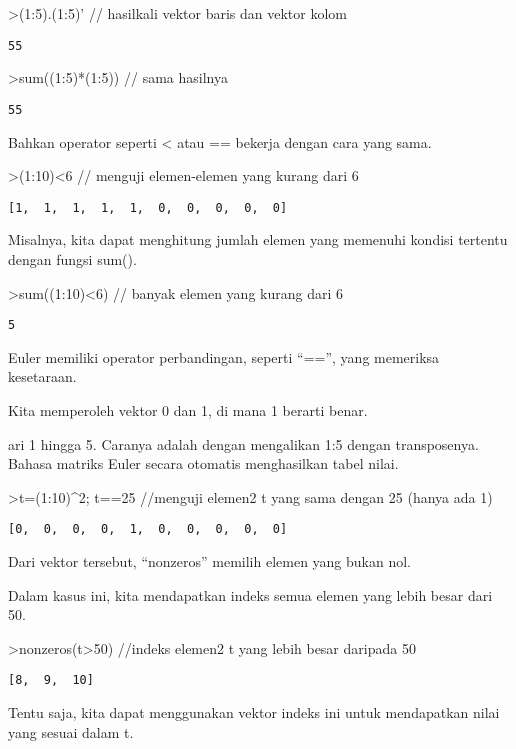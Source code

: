 \documentclass[
]{book}
\begin{document}
\textgreater(1:5).(1:5)' // hasilkali vektor baris dan vektor kolom

\begin{verbatim}
55
\end{verbatim}

\textgreater sum((1:5)*(1:5)) // sama hasilnya

\begin{verbatim}
55
\end{verbatim}

Bahkan operator seperti \textless{} atau == bekerja dengan cara yang sama.

\textgreater(1:10)\textless6 // menguji elemen-elemen yang kurang dari 6

\begin{verbatim}
[1,  1,  1,  1,  1,  0,  0,  0,  0,  0]
\end{verbatim}

Misalnya, kita dapat menghitung jumlah elemen yang memenuhi kondisi tertentu dengan fungsi sum().

\textgreater sum((1:10)\textless6) // banyak elemen yang kurang dari 6

\begin{verbatim}
5
\end{verbatim}

Euler memiliki operator perbandingan, seperti ``=='', yang memeriksa kesetaraan.

Kita memperoleh vektor 0 dan 1, di mana 1 berarti benar.

ari 1 hingga 5. Caranya adalah dengan mengalikan 1:5 dengan transposenya. Bahasa matriks Euler secara otomatis menghasilkan tabel nilai.

\textgreater t=(1:10)\^{}2; t==25 //menguji elemen2 t yang sama dengan 25 (hanya ada 1)

\begin{verbatim}
[0,  0,  0,  0,  1,  0,  0,  0,  0,  0]
\end{verbatim}

Dari vektor tersebut, ``nonzeros'' memilih elemen yang bukan nol.

Dalam kasus ini, kita mendapatkan indeks semua elemen yang lebih besar dari 50.

\textgreater nonzeros(t\textgreater50) //indeks elemen2 t yang lebih besar daripada 50

\begin{verbatim}
[8,  9,  10]
\end{verbatim}

Tentu saja, kita dapat menggunakan vektor indeks ini untuk mendapatkan nilai yang sesuai dalam t.
\end{document}
